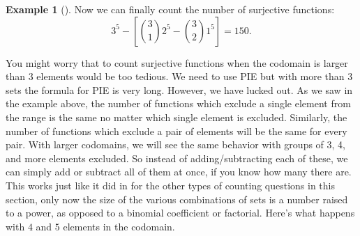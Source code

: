 \documentclass[10pt,]{book}
\theoremstyle{plain}
\theoremstyle{definition}
\newtheorem{example}[theorem]{Example}
\theoremstyle{definition}
\theoremstyle{definition}
\numberwithin{equation}{section}
\begin{document}
\begin{example}[]
    Now we can finally count the number of surjective functions:
    \begin{equation*}
      3^5 - \left[{3 \choose 1}2^5 - {3 \choose 2}1^5\right] = 150.
    \end{equation*}
\end{example}
\par

    You might worry that to count surjective functions when the codomain is larger than 3 elements would be too tedious. We need to use PIE but with more than 3 sets the formula for PIE is very long. However, we have lucked out. As we saw in the example above, the number of functions which exclude a single element from the range is the same no matter which single element is excluded. Similarly, the number of functions which exclude a pair of elements will be the same for every pair. With larger codomains,
    we will see the same behavior with groups of 3, 4, and more elements excluded. So instead of adding/subtracting each of these, we can simply add or subtract all of them at once, if you know how many there are. This works just like it did in for the other types of counting questions in this section, only now the size of the various combinations of sets is a number raised to a power, as opposed to a binomial coefficient or factorial. Here's what happens with \(4\) and \(5\) elements in the codomain.
\end{document}
